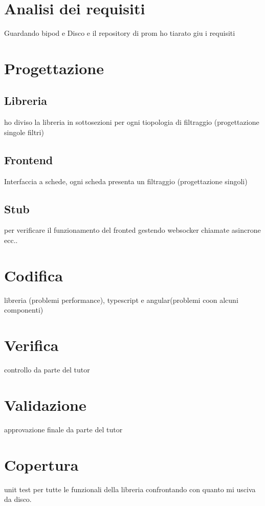 \section{Analisi dei requisiti}
Guardando bipod e Disco e il repository di prom ho tiarato giu i requisiti
\section{Progettazione}
\subsection{Libreria}
ho diviso la libreria in sottosezioni per ogni tiopologia di filtraggio (progettazione singole filtri) 
\subsection{Frontend}
Interfaccia a schede, ogni scheda presenta un filtraggio (progettazione singoli)
\subsection{Stub}
per verificare il funzionamento del fronted gestendo websocker chiamate asincrone ecc..
\section{Codifica}
libreria (problemi performance), typescript e angular(problemi coon alcuni componenti)
\section{Verifica}
controllo da parte del tutor
\section{Validazione}
approvazione finale da parte del tutor
\section{Copertura}
unit test per tutte le funzionali della libreria confrontando con quanto mi usciva da disco.